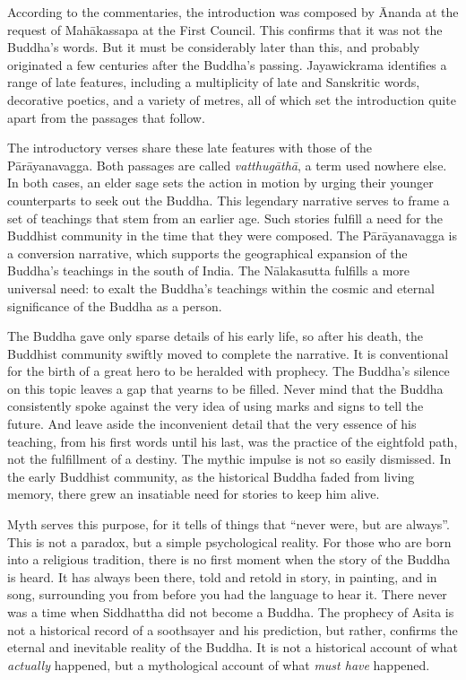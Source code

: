 \documentclass[12pt,openany]{book}%
\begin{document}
According to the commentaries, the introduction was composed by Ānanda at the request of \textsanskrit{Mahākassapa} at the First Council. This confirms that it was not the Buddha’s words. But it must be considerably later than this, and probably originated a few centuries after the Buddha’s passing. Jayawickrama identifies a range of late features, including a multiplicity of late and Sanskritic words, decorative poetics, and a variety of metres, all of which set the introduction quite apart from the passages that follow.

The introductory verses share these late features with those of the \textsanskrit{Pārāyanavagga}. Both passages are called \textit{\textsanskrit{vatthugāthā}}, a term used nowhere else. In both cases, an elder sage sets the action in motion by urging their younger counterparts to seek out the Buddha. This legendary narrative serves to frame a set of teachings that stem from an earlier age. Such stories fulfill a need for the Buddhist community in the time that they were composed. The \textsanskrit{Pārāyanavagga} is a conversion narrative, which supports the geographical expansion of the Buddha’s teachings in the south of India. The \textsanskrit{Nālakasutta} fulfills a more universal need: to exalt the Buddha’s teachings within the cosmic and eternal significance of the Buddha as a person.

The Buddha gave only sparse details of his early life, so after his death, the Buddhist community swiftly moved to complete the narrative. It is conventional for the birth of a great hero to be heralded with prophecy. The Buddha’s silence on this topic leaves a gap that yearns to be filled. Never mind that the Buddha consistently spoke against the very idea of using marks and signs to tell the future. And leave aside the inconvenient detail that the very essence of his teaching, from his first words until his last, was the practice of the eightfold path, not the fulfillment of a destiny. The mythic impulse is not so easily dismissed. In the early Buddhist community, as the historical Buddha faded from living memory, there grew an insatiable need for stories to keep him alive.

Myth serves this purpose, for it tells of things that “never were, but are always”. This is not a paradox, but a simple psychological reality. For those who are born into a religious tradition, there is no first moment when the story of the Buddha is heard. It has always been there, told and retold in story, in painting, and in song, surrounding you from before you had the language to hear it. There never was a time when Siddhattha did not become a Buddha. The prophecy of Asita is not a historical record of a soothsayer and his prediction, but rather, confirms the eternal and inevitable reality of the Buddha. It is not a historical account of what \emph{actually} happened, but a mythological account of what \emph{must have} happened.
\end{document}
